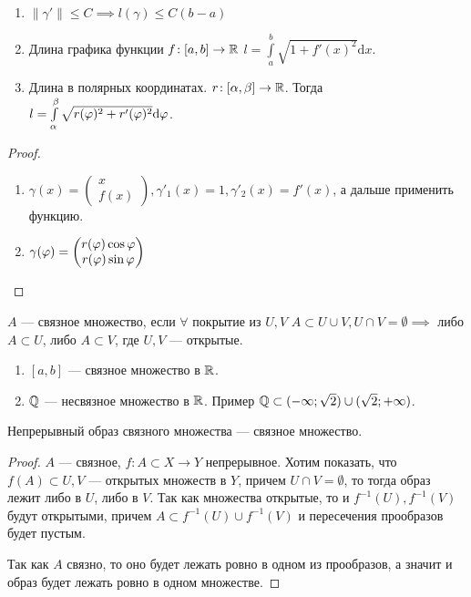 \begin{consequence}
    \begin{enumerate}
        \item $\| \gamma' \| \le C \implies l(\gamma) \le C(b-a)$
        \item Длина графика функции $f\!: [a, b] \to \mathbb{R}$  $l = \int\limits_a^b \sqrt{1 + f'(x)^2} \mathrm{d}x$.
        \item Длина в полярных координатах. $r\!: [\alpha, \beta] \to \mathbb{R}$. Тогда  $l = \int\limits_\alpha^\beta \sqrt{r(\varphi)^2 + r'(\varphi)^2} \mathrm{d}\varphi$. 
    \end{enumerate}
\end{consequence}
\begin{proof}
    \begin{enumerate}
        \addtocounter{enumi}{1}
        \item $\gamma(x) = \begin{pmatrix} x \\ f(x) \end{pmatrix}, \gamma'_1(x) = 1, \gamma'_2(x) = f'(x)$, а дальше применить функцию.
        \item $\gamma(\varphi) = \begin{pmatrix} r(\varphi)\cos \varphi \\ r(\varphi) \sin \varphi \end{pmatrix} $
    \end{enumerate}
\end{proof}
\begin{definition}
    $A$ --- связное множество, если  $\forall$ покрытие из $U, V$  $A \subset U \cup V, U \cap V = \emptyset \implies $ либо  $A \subset U$, либо  $A \subset V$, где $U, V$ --- открытые.
\end{definition}
\begin{example}
    \begin{enumerate}
        \item $[a, b]$ --- связное множество в  $\mathbb{R}$.
        \item  $\mathbb{Q}$ --- несвязное множество в  $\mathbb{R}$. Пример  $\mathbb{Q} \subset (-\infty; \sqrt{2}) \cup (\sqrt{2}; +\infty)$.
    \end{enumerate}
\end{example}
\begin{theorem}
    Непрерывный образ связного множества --- связное множество.
\end{theorem}
\begin{proof}
    $A$ --- связное,  $f\!: A \subset X \to Y$ непрерывное. Хотим показать, что $f(A) \subset U, V$ --- открытых множеств в $Y$, причем  $U \cap V = \emptyset$, то тогда образ лежит либо в $U$, либо в  $V$. Так как множества открытые, то и $f^{-1}(U), f^{-1}(V)$ будут открытыми, причем  $A \subset f^{-1}(U) \cup f^{-1}(V)$ и пересечения прообразов будет пустым.

    Так как $A$ связно, то оно будет лежать ровно в одном из прообразов, а значит и образ будет лежать ровно в одном множестве.
\end{proof}
